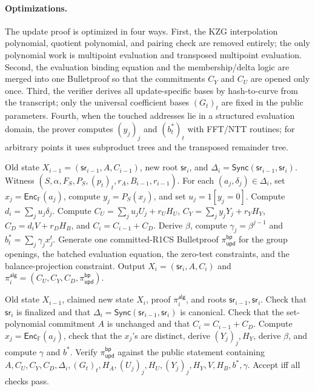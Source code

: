\documentclass[runningheads]{llncs}
\newcommand{\F}{\mathbb{F}}
\newcommand{\Enc}{\mathsf{Enc}}
\newcommand{\sr}{\mathsf{sr}}
\newcommand{\Sync}{\mathsf{Sync}}
\newcommand{\dlist}{\Delta}
\begin{document}
\paragraph{Optimizations.}
The update proof is optimized in four ways.  First, the KZG interpolation polynomial, quotient polynomial, and pairing check are removed entirely; the only polynomial work is multipoint evaluation and transposed multipoint evaluation.  Second, the evaluation binding equation and the membership/delta logic are merged into one Bulletproof so that the commitments \(C_Y\) and \(C_U\) are opened only once.  Third, the verifier derives all update-specific bases by hash-to-curve from the transcript; only the universal coefficient bases \((G_t)_t\) are fixed in the public parameters.  Fourth, when the touched addresses lie in a structured evaluation domain, the prover computes \((y_j)_j\) and \((b_t^*)_t\) with FFT/NTT routines; for arbitrary points it uses subproduct trees and the transposed remainder tree.

\begin{algorithm}[t]
\caption{Bulletproof/IPA algebraic fixed-set update}
\begin{algorithmic}[1]
\Require Old state \(X_{i-1}=(\sr_{i-1},A,C_{i-1})\), new root \(\sr_i\), and \(\dlist_i=\Sync(\sr_{i-1},\sr_i)\).
\Require Witness \((S,\alpha,F_S,P_S,(p_t)_t,r_A,B_{i-1},r_{i-1})\).
\State For each \((a_j,\delta_j)\in\dlist_i\), set \(x_j=\Enc_{\F}(a_j)\), compute \(y_j=P_S(x_j)\), and set \(u_j=1[y_j=0]\).
\State Compute \(d_i=\sum_j u_j\delta_j\).
\State Compute \(C_U=\sum_j u_jU_j+r_UH_U\), \(C_Y=\sum_jy_jY_j+r_YH_Y\), \(C_D=d_iV+r_DH_B\), and \(C_i=C_{i-1}+C_D\).
\State Derive \(\beta\), compute \(\gamma_j=\beta^{j-1}\) and \(b_t^*=\sum_j\gamma_jx_j^t\).
\State Generate one committed-R1CS Bulletproof \(\pi_{\mathsf{upd}}^{\mathsf{bp}}\) for the group openings, the batched evaluation equation, the zero-test constraints, and the balance-projection constraint.
\State Output \(X_i=(\sr_i,A,C_i)\) and \(\pi_i^{\mathsf{alg}}=(C_U,C_Y,C_D,\pi_{\mathsf{upd}}^{\mathsf{bp}})\).
\end{algorithmic}
\end{algorithm}

\begin{algorithm}[t]
\caption{Verifier for Bulletproof/IPA algebraic update}
\begin{algorithmic}[1]
\Require Old state \(X_{i-1}\), claimed new state \(X_i\), proof \(\pi_i^{\mathsf{alg}}\), and roots \(\sr_{i-1},\sr_i\).
\State Check that \(\sr_i\) is finalized and that \(\dlist_i=\Sync(\sr_{i-1},\sr_i)\) is canonical.
\State Check that the set-polynomial commitment \(A\) is unchanged and that \(C_i=C_{i-1}+C_D\).
\State Compute \(x_j=\Enc_{\F}(a_j)\), check that the \(x_j\)'s are distinct, derive \((Y_j)_j,H_Y\), derive \(\beta\), and compute \(\gamma\) and \(b^*\).
\State Verify \(\pi_{\mathsf{upd}}^{\mathsf{bp}}\) against the public statement containing \(A,C_U,C_Y,C_D,\dlist_i,(G_t)_t,H_A,(U_j)_j,H_U,(Y_j)_j,H_Y,V,H_B,b^*,\gamma\).
\State Accept iff all checks pass.
\end{algorithmic}
\end{algorithm}
\end{document}
